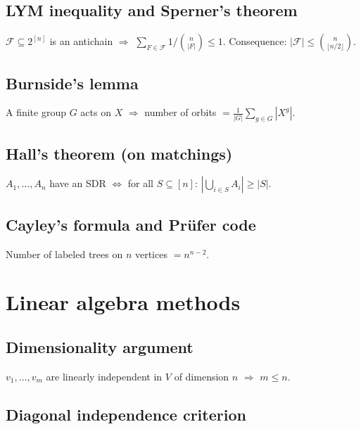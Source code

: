 \subsection{LYM inequality and Sperner's theorem}
\label{subsec:lym-sperner}

$\mathcal{F}\subseteq 2^{[n]}$ is an antichain $\Rightarrow$ $\sum_{F\in\mathcal{F}}1/\binom{n}{|F|}\le 1$. Consequence: $|\mathcal{F}|\le\binom{n}{\lfloor n/2\rfloor}$.

\subsection{Burnside's lemma}
\label{subsec:burnside-combinatorics}

A finite group $G$ acts on $X$ $\Rightarrow$ number of orbits $=\frac{1}{|G|}\sum_{g\in G}|X^g|$.

\subsection{Hall's theorem (on matchings)}
\label{subsec:hall}

$A_1,\dots,A_n$ have an SDR $\iff$ for all $S\subseteq[n]$: $|\bigcup_{i\in S}A_i|\ge|S|$.

\subsection{Cayley's formula and Pr\"ufer code}
\label{subsec:cayley-formula}

Number of labeled trees on $n$ vertices $=n^{n-2}$.

\medskip

\section{Linear algebra methods}
\label{sec:linalg-combinatorics}

\subsection{Dimensionality argument}
\label{subsec:dimensionality}

$v_1,\dots,v_m$ are linearly independent in $V$ of dimension $n$ $\Rightarrow$ $m\le n$.

\subsection{Diagonal independence criterion}
\label{subsec:diagonal-criterion}

